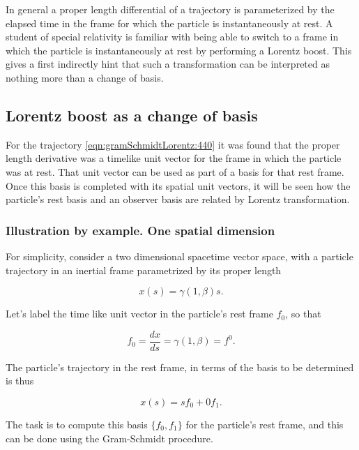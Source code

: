 In general a proper length differential of a trajectory is parameterized by the elapsed time in the frame for which the particle is instantaneously at rest.  A student of special relativity is familiar with being able to switch to a frame in which the particle is instantaneously at rest by performing a Lorentz boost.  This gives a first indirectly hint that such a transformation can be interpreted as nothing more than a change of basis.

\subsection{Lorentz boost as a change of basis}

For the trajectory \ref{eqn:gramSchmidtLorentz:440} it was found that the proper length derivative was a timelike unit vector for the frame in which the particle was at rest.  That unit vector can be used as part of a basis for that rest frame.  Once this basis is completed with its spatial unit vectors, it will be seen how the particle's rest basis and an observer basis are related by Lorentz transformation.

\subsubsection{Illustration by example.  One spatial dimension}

For simplicity, consider a two dimensional spacetime vector space, with a particle trajectory in an inertial frame parametrized by its proper length

\begin{equation}\label{eqn:gramSchmidtLorentz:600}
x(s) = \gamma (1, \beta) s.
\end{equation}

Let's label the time like unit vector in the particle's rest frame $f_0$, so that

\begin{equation}\label{eqn:gramSchmidtLorentz:620}
f_0 = \frac{dx}{ds} = \gamma (1, \beta) = f^0.
\end{equation}

The particle's trajectory in the rest frame, in terms of the basis to be determined is thus

\begin{equation}\label{eqn:gramSchmidtLorentz:640}
x(s) = s f_0 + 0 f_1.
\end{equation}

The task is to compute this basis $\{f_0, f_1\}$ for the particle's rest frame, and this can be done using the Gram-Schmidt procedure.

